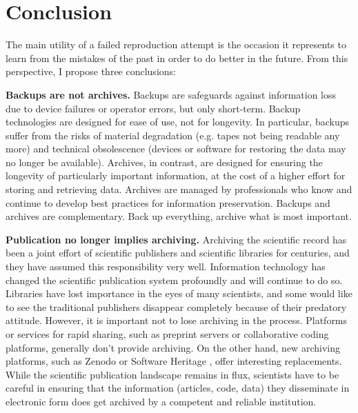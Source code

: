 \section*{Conclusion}

The main utility of a failed reproduction attempt is the occasion it represents to learn from the mistakes of the past in order to do better in the future. From this perspective, I propose three conclusions:

\vspace{2mm}
\textbf{Backups are not archives.} Backups are safeguards against information loss due to device failures or operator errors, but only short-term. Backup technologies are designed for ease of use, not for longevity. In particular, backups suffer from the risks of material degradation (e.g. tapes not being readable any more) and technical obsolescence (devices or software for restoring the data may no longer be available). Archives, in contrast, are designed for ensuring the longevity of particularly important information, at the cost of a higher effort for storing and retrieving data. Archives are managed by professionals who know and continue to develop best practices for information preservation. Backups and archives are complementary. Back up everything, archive what is most important.

\vspace{2mm}
\textbf{Publication no longer implies archiving.} Archiving the scientific record has been a joint effort of scientific publishers and scientific libraries for centuries, and they have assumed this responsibility very well. Information technology has changed the scientific publication system profoundly and will continue to do so. Libraries have lost importance in the eyes of many scientists, and some would like to see the traditional publishers disappear completely because of their predatory attitude. However, it is important not to lose archiving in the process. Platforms or services for rapid sharing, such as preprint servers or collaborative coding platforms, generally don't provide archiving. On the other hand, new archiving platforms, such as Zenodo \cite{Zenodo} or Software Heritage \cite{AbramaticBuildinguniversalarchive2018}, offer interesting replacements. While the scientific publication landscape remains in flux, scientists have to be careful in ensuring that the information (articles, code, data) they disseminate in electronic form does get archived by a competent and reliable institution.

